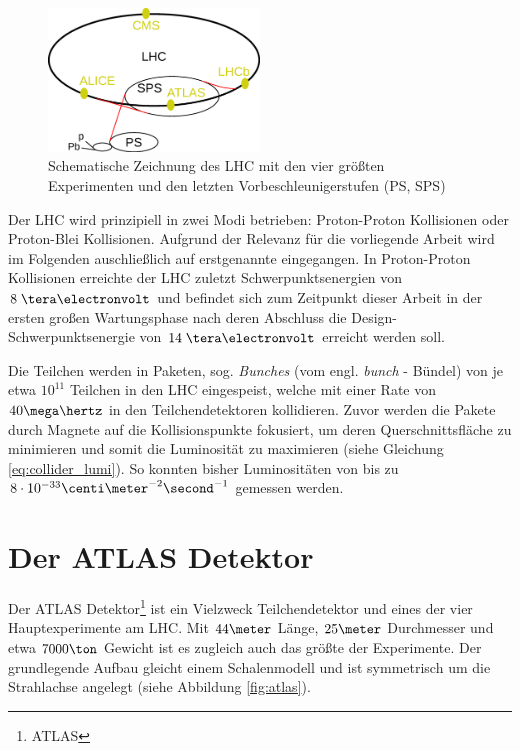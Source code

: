 \begin{figure}[h]
    \centering
    \includegraphics[width=0.5\textwidth]{img/LHC}
    \caption[Zeichnung des LHC mit Vorbeschleunigern und Experimenten]
        {Schematische Zeichnung des LHC mit den vier größten Experimenten und
        den letzten Vorbeschleunigerstufen (PS, SPS)}
    \label{fig:LHC}
\end{figure}

Der \ac{LHC} wird prinzipiell in zwei Modi betrieben: Proton-Proton Kollisionen
oder Proton-Blei Kollisionen. Aufgrund der Relevanz für die vorliegende Arbeit
wird im Folgenden auschließlich auf erstgenannte eingegangen. In Proton-Proton
Kollisionen erreichte der \ac{LHC} zuletzt Schwerpunktsenergien von $8\TeV$ und
befindet sich zum Zeitpunkt dieser Arbeit in der ersten großen Wartungsphase
nach deren Abschluss die Design-Schwerpunktsenergie von $14\TeV$ erreicht
werden soll.

Die Teilchen werden in Paketen, sog. \textit{Bunches} (vom engl. \textit{bunch}
- Bündel) von je etwa $10^{11}$ Teilchen in den \ac{LHC} eingespeist, welche
mit einer Rate von $40\mega\hertz$ in den Teilchendetektoren kollidieren.
Zuvor werden die Pakete durch Magnete auf die Kollisionspunkte fokusiert, um
deren Querschnittsfläche zu minimieren und somit die Luminosität zu maximieren
(siehe Gleichung \ref{eq:collider_lumi}). So konnten bisher Luminositäten von
bis zu $8\cdot 10^{-33} \centi\meter^{-2}\second^{-1}$ gemessen werden.



%
\section{Der ATLAS Detektor}
\label{atlas_detector}


Der ATLAS Detektor\footnote{\acf{ATLAS}} ist ein Vielzweck Teilchendetektor und
eines der vier Hauptexperimente am \ac{LHC}. Mit $44\meter$ Länge, $25\meter$
Durchmesser und etwa $7000\ton$ Gewicht ist es zugleich auch das größte der
Experimente. Der grundlegende Aufbau gleicht einem Schalenmodell und ist
symmetrisch um die Strahlachse angelegt (siehe Abbildung \ref{fig:atlas}).

